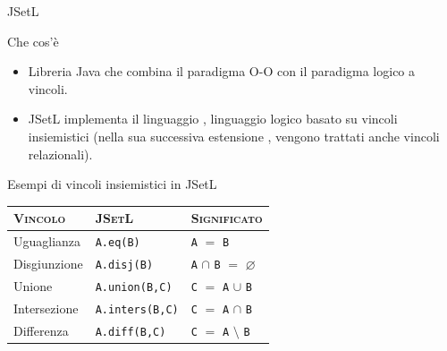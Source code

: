 \documentclass{beamer}
\begin{document}
\begin{frame}{JSetL}
  		
        {
        	\begin{block}{Che cos'\`e}
        	\begin{itemize}
        	\setlength\itemsep{2em}
        	\item Libreria Java che combina il paradigma O-O con il paradigma logico a vincoli.
       	 	\item JSetL implementa il linguaggio , linguaggio logico basato su vincoli insiemistici (nella sua successiva estensione , vengono trattati anche vincoli relazionali).
			\end{itemize}        
        	\end{block}	
        }

\end{frame}

\begin{frame}{Esempi di vincoli insiemistici in JSetL}

\begin{table}[]
\begin{tabular}{|l|l|l|}
\hline
\textsc{Vincolo }     & \textsc{JSetL}           & \textsc{Significato}\\ \hline
Uguaglianza  & \texttt{A.eq(B)}                 & \texttt{A} $=$ \texttt{B}                        \\ \hline
Disgiunzione & \texttt{A.disj(B)}           & \texttt{A} $\cap$ \texttt{B} $=$ $\varnothing$   \\ \hline
Unione       & \texttt{A.union(B,C)}    & \texttt{C} $=$ \texttt{A} $\cup$ \texttt{B}      \\ \hline
Intersezione & \texttt{A.inters(B,C)}  & \texttt{C} $=$ \texttt{A} $\cap$ \texttt{B}      \\ \hline
Differenza   & \texttt{A.diff(B,C)}      & \texttt{C} $=$ \texttt{A} $\setminus$ \texttt{B} \\ \hline
\end{tabular}
\end{table}

\end{frame}

\end{document}
